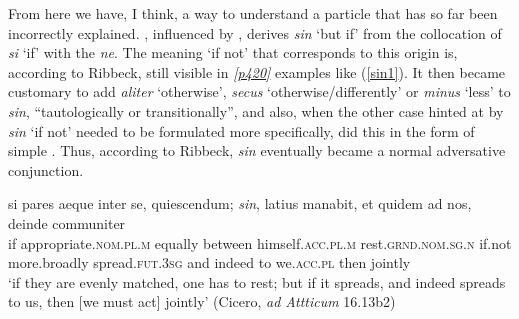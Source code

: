 From here we have, I think, a way to understand a particle that has so far been incorrectly explained. \citet[14f.]{Ribbeck1869}, influenced by \citet[526]{StolzSchmalz1890}, derives \emph{sin} `but if' from the collocation of \emph{si} `if' with the  \emph{ne}. The meaning `if not' that corresponds to this origin is, according to Ribbeck, still visible in \hyperlink{p420}{\emph{[p420]}} examples like (\ref{sin1}). It then became customary to add \emph{aliter} `otherwise', \emph{secus} `otherwise/differently' or \emph{minus} `less' to \emph{sin}, ``tautologically or transitionally'', and also, when the other case hinted at by \emph{sin} `if not' needed to be formulated more specifically, did this in the form of simple . Thus, according to Ribbeck, \emph{sin} eventually became a normal adversative conjunction.

\begin{exe}
\ex
\gll si pares aeque inter se, quiescendum; \emph{sin}, latius manabit, et quidem ad nos, deinde communiter\\
if appropriate.\textsc{nom.pl.m} equally between himself.\textsc{acc.pl.m} rest.\textsc{grnd.nom.sg.n} if.not more.broadly spread.\textsc{fut.3sg} and indeed to we.\textsc{acc.pl} then jointly\\
\trans `if they are evenly matched, one has to rest; but if it spreads, and indeed spreads to us, then [we must act] jointly' (Cicero, \textit{ad Attticum} 16.13b2)
\label{sin1}
\end{exe}

